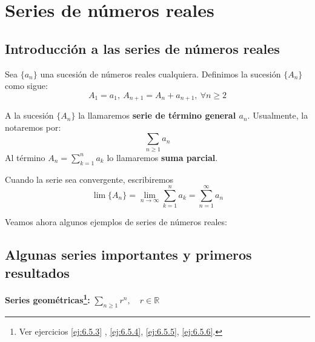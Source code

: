 \chapter{Series de números reales}


\section{Introducción a las series de números reales}
\begin{definicion}
    Sea $\{a_n\}$ una sucesión de números reales cualquiera. Definimos la sucesión $\{A_n\}$ como sigue:
    \begin{equation*}
        A_1 = a_1, ~ A_{n+1} = A_n + a_{n+1}, ~\forall n \geq 2
    \end{equation*}
    
    A la sucesión $\{A_n\}$ la llamaremos \textbf{serie de término general $a_n$}. Usualmente, la notaremos por:
    \begin{equation*}
        \sum_{n \geq 1} a_n
    \end{equation*}
    Al término $A_n = \displaystyle\sum_{k = 1}^{n} a_k$ lo llamaremos \textbf{suma parcial}.

    Cuando la serie sea convergente, escribiremos
    \begin{equation*}
        \lim \{A_n\} = \lim_{n \to \infty} \displaystyle\sum_{k = 1}^{n} a_k = \sum_{n = 1}^{\infty} a_n 
    \end{equation*}

\end{definicion}

Veamos ahora algunos ejemplos de series de números reales:


%

\section{Algunas series importantes y primeros resultados}
\noindent\textbf{Series geométricas\footnote{ Ver ejercicios \ref{ej:6.5.3} , \ref{ej:6.5.4}, \ref{ej:6.5.5}, \ref{ej:6.5.6}.}:}
$\displaystyle \sum_{n \geq 1} r^n,\quad r \in \mathbb{R}$

